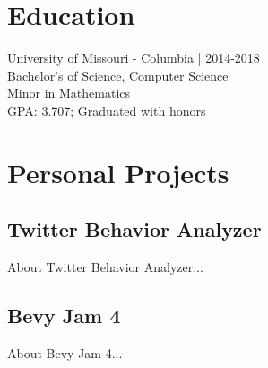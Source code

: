 \documentclass[10pt]{article}
\begin{document}
\section*{Education}
University of Missouri - Columbia | 2014-2018\\
Bachelor's of Science, Computer Science\\
Minor in Mathematics\\
GPA: 3.707; Graduated with honors

\section*{Personal Projects}

\subsection*{Twitter Behavior Analyzer}

About Twitter Behavior Analyzer...

\subsection*{Bevy Jam 4}

About Bevy Jam 4...
\end{document}
